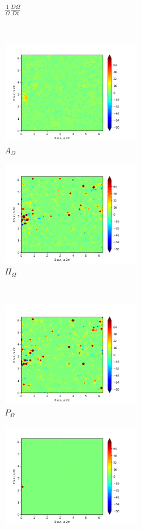 \begin{figure}[H]
\begin{subfigure}[H]{0.45\textwidth}
        \caption{$\frac{1}{\Omega} \frac{D \Omega}{Dt}$}
    \end{subfigure}
    ~
    \begin{subfigure}{0.45\textwidth}
        \includegraphics[height=1.75in]{media/run-cds-65/A-enst-1480.png}
        \caption{$A_{\Omega}$}
    \end{subfigure}
    \newline
    \begin{subfigure}{0.45\textwidth}
        \includegraphics[height=1.75in]{media/run-cds-65/Pi-enst-1480.png}
        \caption{$\Pi_{\Omega}$}
    \end{subfigure}
    ~
    \begin{subfigure}{0.45\textwidth}
        \includegraphics[height=1.75in]{media/run-cds-65/P-enst-1480.png}
        \caption{$P_{\Omega}$}
    \end{subfigure}
    \newline
    \begin{subfigure}{0.45\textwidth}
        \includegraphics[height=1.75in]{media/run-cds-65/B-enst-1480.png}

\end{subfigure}
\end{figure}
